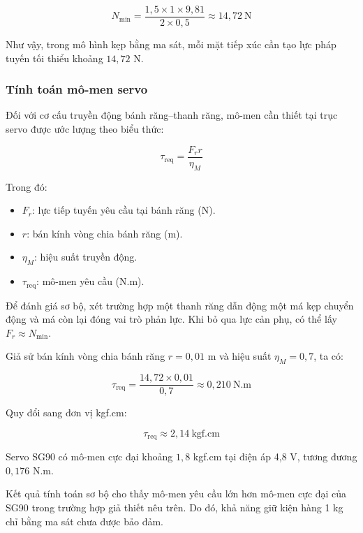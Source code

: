 \begin{equation}
    N_{\min}
    = \frac{1{,}5 \times 1 \times 9{,}81}
    {2 \times 0{,}5}
    \approx 14{,}72 \ \text{N}
\end{equation}

Như vậy, trong mô hình kẹp bằng ma sát,
mỗi mặt tiếp xúc cần tạo lực pháp tuyến
tối thiểu khoảng $14{,}72$ N.

\subsubsection{Tính toán mô-men servo}

Đối với cơ cấu truyền động bánh răng--thanh răng,
mô-men cần thiết tại trục servo được ước lượng
theo biểu thức:

\begin{equation}
    \tau_{\mathrm{req}}
    = \frac{F_r r}{\eta_M}
    \label{eq:gripper_torque}
\end{equation}

Trong đó:
\begin{itemize}
    \item $F_r$: lực tiếp tuyến yêu cầu tại
    bánh răng (N).
    \item $r$: bán kính vòng chia bánh răng (m).
    \item $\eta_M$: hiệu suất truyền động.
    \item $\tau_{\mathrm{req}}$: mô-men yêu cầu (N.m).
\end{itemize}

Để đánh giá sơ bộ, xét trường hợp một thanh răng
dẫn động một má kẹp chuyển động và má còn lại
đóng vai trò phản lực. Khi bỏ qua lực cản phụ,
có thể lấy $F_r \approx N_{\min}$.

Giả sử bán kính vòng chia bánh răng
$r = 0{,}01$ m và hiệu suất
$\eta_M = 0{,}7$, ta có:

\begin{equation}
    \tau_{\mathrm{req}}
    = \frac{14{,}72 \times 0{,}01}{0{,}7}
    \approx 0{,}210 \ \text{N.m}
\end{equation}

Quy đổi sang đơn vị kgf.cm:

\begin{equation}
    \tau_{\mathrm{req}}
    \approx 2{,}14 \ \text{kgf.cm}
\end{equation}

Servo SG90 có mô-men cực đại khoảng
$1{,}8$ kgf.cm tại điện áp 4,8 V,
tương đương $0{,}176$ N.m.

Kết quả tính toán sơ bộ cho thấy mô-men
yêu cầu lớn hơn mô-men cực đại của SG90
trong trường hợp giả thiết nêu trên.
Do đó, khả năng giữ kiện hàng 1 kg
chỉ bằng ma sát chưa được bảo đảm.

